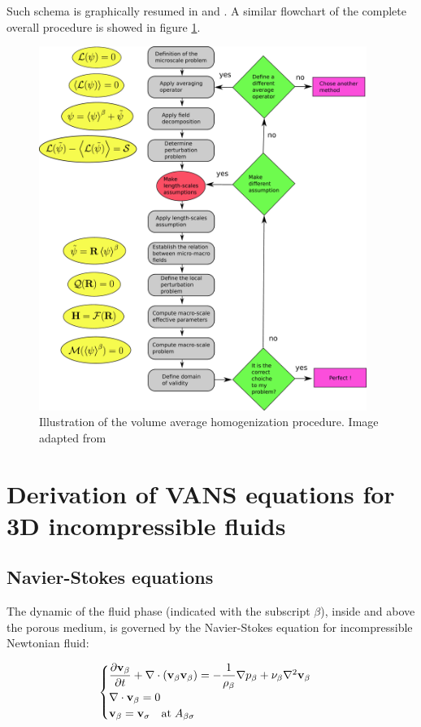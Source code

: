 Such schema is graphically resumed in \citet{paez2017macroscopic} and \citet{davit2013homogenization}. A similar flowchart of the complete overall procedure is showed in figure \ref{fig:schema_vans_homo}.

\begin{figure}[h!]
	\centering
	\includegraphics[width=0.95\textwidth,height=0.95\textheight,keepaspectratio]{chapter_2/figure/schema}
	\caption{Illustration of the volume average homogenization procedure. Image adapted from \citet{davit2013homogenization}}
	\label{fig:schema_vans_homo}
\end{figure}

\section{Derivation of VANS equations for 3D incompressible fluids}
\subsection{Navier-Stokes equations}
The dynamic of the fluid phase (indicated with the subscript $\beta$), inside and above the porous medium, is governed by the Navier-Stokes equation for incompressible Newtonian fluid:

\begin{eqnarray}
	\begin{cases}
		\dfrac{\partial \textbf{v}_{\beta}}{\partial t} +  \nabla \cdot (\textbf{v}_{\beta} \textbf{v}_{\beta})  = -\dfrac{1}{\rho_{\beta}} \nabla p_{\beta} + \nu_{\beta} \nabla^2  \textbf{v}_{\beta}  \\
		\nabla \cdot \textbf{v}_{\beta} = 0 \\
		\textbf{v}_{\beta} = \textbf{v}_{\sigma} \quad \text{at} \; A_{\beta\sigma}
	\end{cases}
\label{eq:NS}
\end{eqnarray}\\

